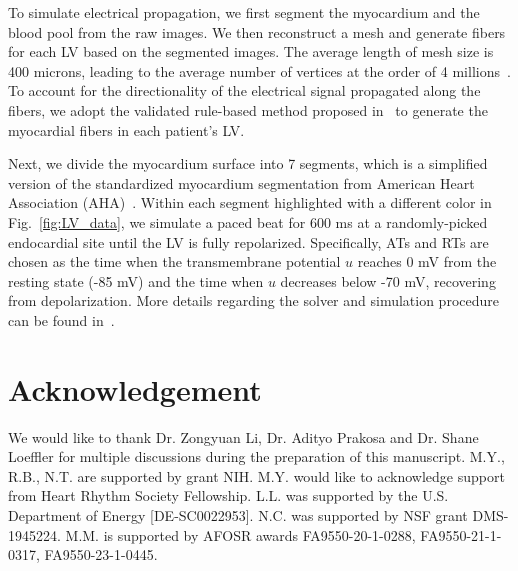 \documentclass[review]{elsarticle}
\begin{document}
To simulate electrical propagation, we first segment the myocardium and the blood pool from the raw images. We then reconstruct a mesh and generate fibers for each LV based on the segmented images. The average length of mesh size is 400 microns, leading to the average number of vertices at the order of 4 millions~\cite{boyle2021characterizing,prakosa2018personalized}. To account for the directionality of the electrical signal propagated along the fibers, we adopt the validated rule-based method proposed in~\cite{bayer2012novel} to generate the myocardial fibers in each patient's LV. 

Next, we divide the myocardium surface into 7 segments, which is a simplified version of the standardized myocardium segmentation from American Heart Association (AHA)~\cite{american2002standardized,deng2019sensitivity}. Within each segment highlighted with a different color in Fig.~\ref{fig:LV_data}, we simulate a paced beat for 600 ms at a randomly-picked endocardial site until the LV is fully repolarized. Specifically, ATs and RTs are chosen as the time when the transmembrane potential $u$ reaches 0 mV from the resting state (-85 mV) and the time when $u$ decreases below -70 mV, recovering from depolarization. More details regarding the solver and simulation procedure can be found in~\cite{plank2021opencarp,prakosa2018personalized}.



\section{Acknowledgement} 
We would like to thank Dr. Zongyuan Li, Dr. Adityo Prakosa and Dr. Shane Loeffler for multiple discussions during the preparation of this manuscript. M.Y., R.B., N.T. are supported by grant NIH. M.Y. would like to acknowledge support from Heart Rhythm Society Fellowship. L.L. was supported by the U.S. Department of Energy [DE-SC0022953]. N.C. was supported by NSF grant DMS-1945224. M.M. is supported by AFOSR awards FA9550-20-1-0288, FA9550-21-1-0317, FA9550-23-1-0445.
 


\appendix





\end{document}
